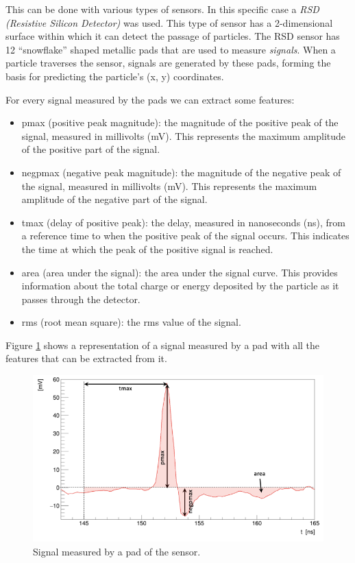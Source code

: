 \documentclass[conference]{IEEEtran}
\begin{document}
This can be done with various types of sensors. In this specific case a \textit{RSD (Resistive Silicon Detector)} 
was used. This type of sensor has a 2-dimensional surface within which it can detect the passage of particles.
The RSD sensor has 12 “snowflake” shaped metallic pads that are used to measure \textit{signals}. 
When a particle traverses the sensor, signals are generated by these pads, forming the basis for predicting 
the particle's (x, y) coordinates.

For every signal measured by the pads we can extract some features:
\begin{itemize}
    \item pmax (positive peak magnitude): the magnitude of the positive peak of the signal, measured in millivolts (mV). 
    This represents the maximum amplitude of the positive part of the signal.
    \item negpmax (negative peak magnitude): the magnitude of the negative peak of the signal, measured in millivolts (mV). 
    This represents the maximum amplitude of the negative part of the signal.
    \item tmax (delay of positive peak): the delay, measured in nanoseconds (ns), from a reference time to when the positive peak of the signal occurs. 
    This indicates the time at which the peak of the positive signal is reached.
    \item area (area under the signal): the area under the signal curve.
    This provides information about the total charge or energy deposited by the particle as it passes through the detector.
    \item rms (root mean square): the rms value of the signal.
\end{itemize}

Figure \ref{fig:sensor_reading} shows a representation of a signal measured by a pad with all the features 
that can be extracted from it.\\
\begin{figure}[htbp]
\centerline{\includegraphics[width=\linewidth]{media/sensor_signal.png}}
\caption{Signal measured by a pad of the sensor.}
\label{fig:sensor_reading}
\end{figure}
\end{document}

